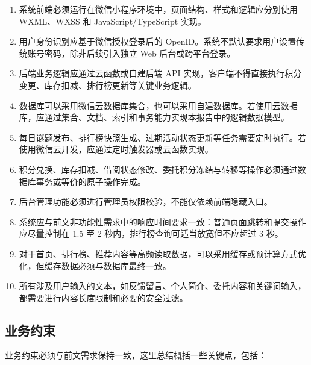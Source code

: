 \documentclass[a4paper,12pt]{article}
\begin{document}
\begin{enumerate}
    \item 系统前端必须运行在微信小程序环境中，页面结构、样式和逻辑应分别使用 WXML、WXSS 和 JavaScript/TypeScript 实现。
    \item 用户身份识别应基于微信授权登录后的 OpenID。系统不默认要求用户设置传统账号密码，除非后续引入独立 Web 后台或跨平台登录。
    \item 后端业务逻辑应通过云函数或自建后端 API 实现，客户端不得直接执行积分变更、库存扣减、排行榜更新等关键业务逻辑。
    \item 数据库可以采用微信云数据库集合，也可以采用自建数据库。若使用云数据库，应通过集合、文档、索引和事务能力实现本报告中的逻辑数据模型。
    \item 每日谜题发布、排行榜快照生成、过期活动状态更新等任务需要定时执行。若使用微信云开发，应通过定时触发器或云函数实现。
    \item 积分兑换、库存扣减、借阅状态修改、委托积分冻结与转移等操作必须通过数据库事务或等价的原子操作完成。
    \item 后台管理功能必须进行管理员权限校验，不能仅依赖前端隐藏入口。
    \item 系统应与前文非功能性需求中的响应时间要求一致：普通页面跳转和提交操作应尽量控制在 1.5 至 2 秒内，排行榜查询可适当放宽但不应超过 3 秒。
    \item 对于首页、排行榜、推荐内容等高频读取数据，可以采用缓存或预计算方式优化，但缓存数据必须与数据库最终一致。
    \item 所有涉及用户输入的文本，如反馈留言、个人简介、委托内容和关键词输入，都需要进行内容长度限制和必要的安全过滤。
\end{enumerate}

\subsection{业务约束}

业务约束必须与前文需求保持一致，这里总结概括一些关键点，包括：
\end{document}

